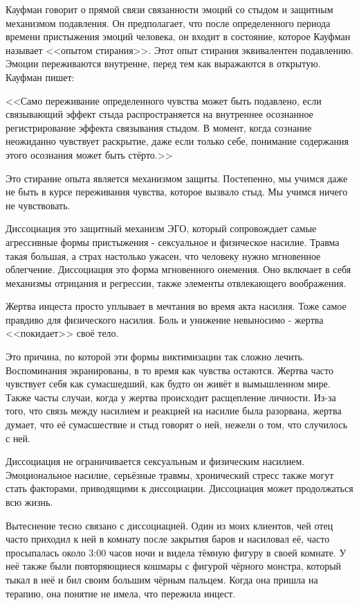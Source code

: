 \documentclass[10pt, fleqn]{article}
\begin{document}
Кауфман говорит о прямой связи связанности эмоций со стыдом и защитным механизмом подавления. Он предполагает, что после определенного периода времени пристыжения эмоций человека, он входит в состояние, которое Кауфман называет <<опытом стирания>>. Этот опыт стирания эквивалентен подавлению. Эмоции переживаются внутренне, перед тем как выражаются в открытую. Кауфман пишет:

<<Само переживание определенного чувства может быть подавлено, если связывающий эффект стыда распространяется на внутреннее осознанное регистрирование эффекта связывания стыдом. В момент, когда сознание неожиданно чувствует раскрытие, даже если только себе, понимание содержания этого осознания может быть стёрто.>>

Это стирание опыта является механизмом защиты. Постепенно, мы учимся даже не быть в курсе переживания чувства, которое вызвало стыд. Мы учимся ничего не чувствовать.


Диссоциация это защитный механизм ЭГО, который сопровождает самые агрессивные формы пристыжения - сексуальное и физическое насилие. Травма такая большая, а страх настолько ужасен, что человеку нужно мгновенное облегчение. Диссоциация это форма мгновенного онемения. Оно включает в себя механизмы отрицания и регрессии, также элементы отвлекающего воображения.

Жертва инцеста просто уплывает в мечтания во время акта насилия. Тоже самое правдиво для физического насилия. Боль и унижение невыносимо - жертва <<покидает>> своё тело.

Это причина, по которой эти формы виктимизации так сложно лечить. Воспоминания экранированы, в то время как чувства остаются. Жертва часто чувствует себя как сумасшедший, как будто он живёт в вымышленном мире. Также часты случаи, когда у жертва происходит расщепление личности. Из-за того, что связь между насилием и реакцией на насилие была разорвана, жертва думает, что её сумасшествие и стыд говорят о ней, нежели о том, что случилось с ней.

Диссоциация не ограничивается сексуальным и физическим насилием. Эмоциональное насилие, серьёзные травмы, хронический стресс также могут стать факторами, приводящими к диссоциации. Диссоциация может продолжаться всю жизнь.


Вытеснение тесно связано с диссоциацией.
Один из моих клиентов, чей отец часто приходил к ней в комнату после закрытия баров и насиловал её, часто просыпалась около 3:00 часов ночи и видела тёмную фигуру в своей комнате. У неё также были повторяющиеся кошмары с фигурой чёрного монстра, который тыкал в неё и бил своим большим чёрным пальцем. Когда она пришла на терапию, она понятие не имела, что пережила инцест.
\end{document}
